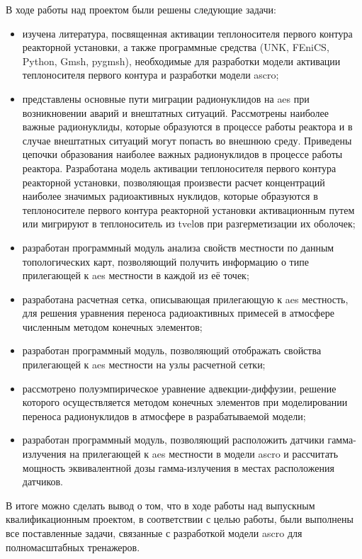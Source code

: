 В ходе работы над проектом были решены следующие задачи:
\begin{itemize}
	\item изучена литература, посвященная активации теплоносителя первого контура реакторной установки, а также 
	программные средства (UNK, FEniCS, Python, Gmsh, pygmsh), необходимые для разработки модели активации теплоносителя 
	первого контура и разработки модели \ac{ascro};
	\item представлены основные пути миграции радионуклидов на \ac{aes} при возникновении аварий и внештатных ситуаций. 
	Рассмотрены наиболее важные радионуклиды, которые образуются в процессе работы реактора и в случае внештатных 
	ситуаций могут попасть во внешнюю среду. Приведены цепочки образования наиболее важных радионуклидов в процессе 
	работы реактора. Разработана модель активации теплоносителя первого контура реакторной установки, позволяющая 
	произвести расчет концентраций наиболее значимых радиоактивных нуклидов, которые образуются в теплоносителе первого 
	контура реакторной установки активационным путем или мигрируют в теплоноситель из \ac{tvel}ов при разгерметизации 
	их оболочек;
	\item разработан программный модуль анализа свойств местности по данным топологических карт, позволяющий получить 
	информацию о типе прилегающей к \ac{aes} местности в каждой из её точек;
	\item разработана расчетная сетка, описывающая прилегающую к \ac{aes} местность, для решения уравнения переноса 
	радиоактивных примесей в атмосфере численным методом конечных элементов;
	\item разработан программный модуль, позволяющий отображать свойства прилегающей к \ac{aes} местности на узлы 
	расчетной сетки;
	\item рассмотрено полуэмпирическое уравнение адвекции-диффузии, решение которого осуществляется методом конечных 
	элементов при моделировании переноса радионуклидов в атмосфере в разрабатываемой модели;
	\item разработан программный модуль, позволяющий расположить датчики гамма-излучения на прилегающей к \ac{aes} 
	местности в модели \ac{ascro} и рассчитать мощность эквивалентной дозы гамма-излучения в местах расположения 
	датчиков.
\end{itemize}

В итоге можно сделать вывод о том, что в ходе работы над выпускным квалификационным проектом, в соответствии с целью 
работы, были выполнены все поставленные задачи, связанные с разработкой модели \ac{ascro} для полномасштабных тренажеров.